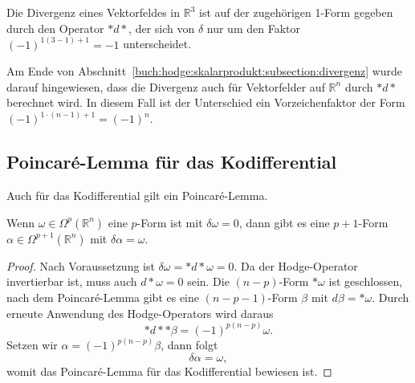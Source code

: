 Die Divergenz eines Vektorfeldes in $\mathbb{R}^3$ ist auf der
zugehörigen 1-Form gegeben durch den Operator ${\ast}d{\ast}$,
der sich von $\delta$ nur um den Faktor $(-1)^{1(3-1)+1}=-1$
unterscheidet.

Am Ende von Abschnitt~\ref{buch:hodge:skalarprodukt:subsection:divergenz}
wurde darauf hingewiesen, dass die Divergenz auch für Vektorfelder
auf $\mathbb{R}^n$ durch ${\ast}d{\ast}$ berechnet wird.
In diesem Fall ist der Unterschied ein Vorzeichenfaktor der Form
$(-1)^{1\cdot(n-1)+1}=(-1)^n$.

%
%
\subsection{Poincaré-Lemma für das Kodifferential}
Auch für das Kodifferential gilt ein Poincaré-Lemma.

\begin{satz}
Wenn $\omega \in \Omega^p(\mathbb{R}^n)$ eine $p$-Form ist mit
$\delta\omega=0$, dann gibt es eine $p+1$-Form
$\alpha\in\Omega^{p+1}(\mathbb{R}^n)$ mit $\delta\alpha=\omega$.
\end{satz}

\begin{proof}
Nach Voraussetzung ist $\delta \omega = {\ast}d{\ast}\omega = 0$.
Da der Hodge-Operator invertierbar ist, muss auch $d{\ast}\omega=0$
sein.
Die $(n-p)$-Form $\ast\omega$ ist geschlossen, nach dem Poincaré-Lemma
gibt es eine $(n-p-1)$-Form $\beta$ mit $d\beta=\ast\omega$.
Durch erneute Anwendung des Hodge-Operators wird daraus
\[
{\ast}d{\ast} {\ast}\beta = (-1)^{p(n-p)}\omega.
\]
Setzen wir $\alpha=(-1)^{p(n-p)}\beta$, dann folgt
\[
\delta \alpha = \omega,
\]
womit das Poincaré-Lemma für das Kodifferential bewiesen ist.
\end{proof}

